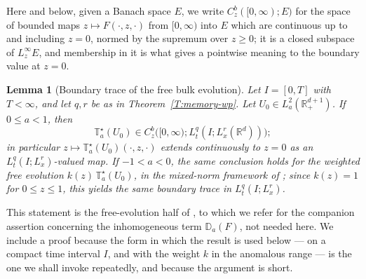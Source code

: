 \documentclass[11pt,letter]{amsart}
\def \RN {\mathbb{R}_+^{d+1}}
\newcommand{\Rd}{\mathbb R^d}
\numberwithin{equation}{section}
\newtheorem{lemma}[theorem]{Lemma}
\numberwithin{equation}{section}
\begin{document}
Here and below, given a Banach space $E$, we write $C^b_z([0,\infty);E)$ for
the space of bounded maps $z\mapsto F(\cdot,z,\cdot)$ from $[0,\infty)$ into
$E$ which are continuous up to and including $z=0$, normed by the supremum
over $z\ge0$; it is a closed subspace of $L^\infty_z E$, and membership in it
is what gives a pointwise meaning to the boundary value at $z=0$.

\begin{lemma}[Boundary trace of the free bulk evolution]\label{L:free-trace}
Let $I=[0,T]$ with $T<\infty$, and let $q,r$ be as in
Theorem~\ref{T:memory-wp}. Let $U_0\in L_a^2(\RN)$. If $0\le a<1$, then
\[
\mathbb T_a^\star(U_0)\in C^b_z\bigl([0,\infty);L_t^q(I;L_x^r(\Rd))\bigr);
\]
in particular $z\mapsto\mathbb T_a^\star(U_0)(\cdot,z,\cdot)$ extends
continuously to $z=0$ as an $L_t^q(I;L_x^r)$-valued map. If $-1<a<0$, the same
conclusion holds for the weighted free evolution
$k(z)\,\mathbb T_a^\star(U_0)$, in the mixed-norm framework of
\cite[Theorem~2.5]{GS2}; since $k(z)=1$ for $0\le z\le1$, this yields the same
boundary trace in $L_t^q(I;L_x^r)$.
\end{lemma}

\medskip
This statement is the free-evolution half of \cite[Theorem~8.2]{GS2}, to which
we refer for the companion assertion concerning the inhomogeneous term
$\mathbb D_a(F)$, not needed here. We include a proof because the form in which
the result is used below --- on a compact time interval $I$, and with the
weight $k$ in the anomalous range --- is the one we shall invoke repeatedly,
and because the argument is short.
\end{document}
